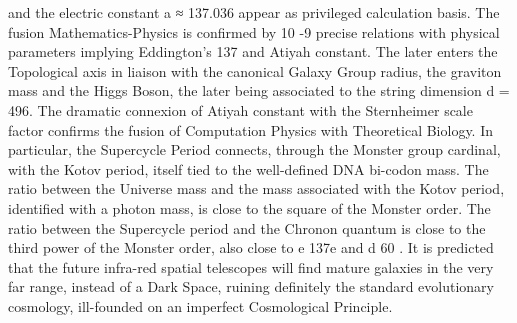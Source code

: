 and the electric constant a ≈ 137.036 appear as privileged calculation basis. The fusion
Mathematics-Physics is confirmed by 10 -9 precise relations with physical parameters
implying Eddington's 137 and Atiyah constant. The later enters the Topological axis in
liaison with the canonical Galaxy Group radius, the graviton mass and the Higgs Boson,
the later being associated to the string dimension d = 496. The dramatic connexion of
Atiyah constant with the Sternheimer scale factor confirms the fusion of Computation
Physics with Theoretical Biology. In particular, the Supercycle Period connects, through the
Monster group cardinal, with the Kotov period, itself tied to the well-defined DNA bi-codon
mass. The ratio between the Universe mass and the mass associated with the Kotov period,
identified with a photon mass, is close to the square of the Monster order. The ratio between
the Supercycle period and the Chronon quantum is close to the third power of the Monster
order, also close to e 137e and d 60 . It is predicted that the future infra-red spatial telescopes
will find mature galaxies in the very far range, instead of a Dark Space, ruining definitely
the standard evolutionary cosmology, ill-founded on an imperfect Cosmological Principle.
